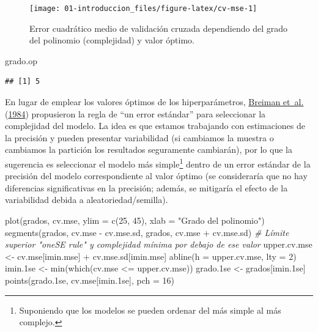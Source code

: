 \documentclass[
  spanish,
]{book}
\newenvironment{Shaded}{\begin{snugshade}}{\end{snugshade}}
\newcommand{\AttributeTok}[1]{\textcolor[rgb]{0.77,0.63,0.00}{#1}}
\newcommand{\CommentTok}[1]{\textcolor[rgb]{0.56,0.35,0.01}{\textit{#1}}}
\newcommand{\DecValTok}[1]{\textcolor[rgb]{0.00,0.00,0.81}{#1}}
\newcommand{\FloatTok}[1]{\textcolor[rgb]{0.00,0.00,0.81}{#1}}
\newcommand{\FunctionTok}[1]{\textcolor[rgb]{0.00,0.00,0.00}{#1}}
\newcommand{\NormalTok}[1]{#1}
\newcommand{\OtherTok}[1]{\textcolor[rgb]{0.56,0.35,0.01}{#1}}
\newcommand{\SpecialCharTok}[1]{\textcolor[rgb]{0.00,0.00,0.00}{#1}}
\newcommand{\StringTok}[1]{\textcolor[rgb]{0.31,0.60,0.02}{#1}}
\theoremstyle{break}
\theoremstyle{definition}
\theoremstyle{definition}
\theoremstyle{definition}
\theoremstyle{definition}
\theoremstyle{remark}
\begin{document}
\begin{figure}[!htb]

{\centering \texttt{[image: 01-introduccion\_files/figure-latex/cv-mse-1]} 

}

\caption{Error cuadrático medio de validación cruzada dependiendo del grado del polinomio (complejidad) y valor óptimo.}\label{fig:cv-mse}
\end{figure}

\begin{Shaded}
\begin{Highlighting}[]
\NormalTok{grado.op}
\end{Highlighting}
\end{Shaded}

\begin{verbatim}
## [1] 5
\end{verbatim}

En lugar de emplear los valores óptimos de los hiperparámetros, \protect\hyperlink{ref-breiman1984classification}{Breiman et~al.} (\protect\hyperlink{ref-breiman1984classification}{1984}) propusieron la regla de ``un error estándar'' para seleccionar la complejidad del modelo.
La idea es que estamos trabajando con estimaciones de la precisión y pueden presentar variabilidad (si cambiamos la muestra o cambiamos la partición los resultados seguramente cambiarán),
por lo que la sugerencia es seleccionar el modelo más simple\footnote{Suponiendo que los modelos se pueden ordenar del más simple al más complejo.} dentro de un error estándar de la precisión del modelo correspondiente al valor óptimo
(se consideraría que no hay diferencias significativas en la precisión;
además, se mitigaría el efecto de la variabilidad debida a aleatoriedad/semilla).

\begin{Shaded}
\begin{Highlighting}[]
\FunctionTok{plot}\NormalTok{(grados, cv.mse, }\AttributeTok{ylim =} \FunctionTok{c}\NormalTok{(}\DecValTok{25}\NormalTok{, }\DecValTok{45}\NormalTok{),}
  \AttributeTok{xlab =} \StringTok{"Grado del polinomio"}\NormalTok{)}
\FunctionTok{segments}\NormalTok{(grados, cv.mse }\SpecialCharTok{{-}}\NormalTok{ cv.mse.sd, grados, cv.mse }\SpecialCharTok{+}\NormalTok{ cv.mse.sd)}
\CommentTok{\# Límite superior "oneSE rule" y complejidad mínima por debajo de ese valor}
\NormalTok{upper.cv.mse }\OtherTok{\textless{}{-}}\NormalTok{ cv.mse[imin.mse] }\SpecialCharTok{+}\NormalTok{ cv.mse.sd[imin.mse]}
\FunctionTok{abline}\NormalTok{(}\AttributeTok{h =}\NormalTok{ upper.cv.mse, }\AttributeTok{lty =} \DecValTok{2}\NormalTok{)}
\NormalTok{imin}\FloatTok{.1}\NormalTok{se }\OtherTok{\textless{}{-}} \FunctionTok{min}\NormalTok{(}\FunctionTok{which}\NormalTok{(cv.mse }\SpecialCharTok{\textless{}=}\NormalTok{ upper.cv.mse))}
\NormalTok{grado}\FloatTok{.1}\NormalTok{se }\OtherTok{\textless{}{-}}\NormalTok{ grados[imin}\FloatTok{.1}\NormalTok{se]}
\FunctionTok{points}\NormalTok{(grado}\FloatTok{.1}\NormalTok{se, cv.mse[imin}\FloatTok{.1}\NormalTok{se], }\AttributeTok{pch =} \DecValTok{16}\NormalTok{)}
\end{Highlighting}
\end{Shaded}
\end{document}
